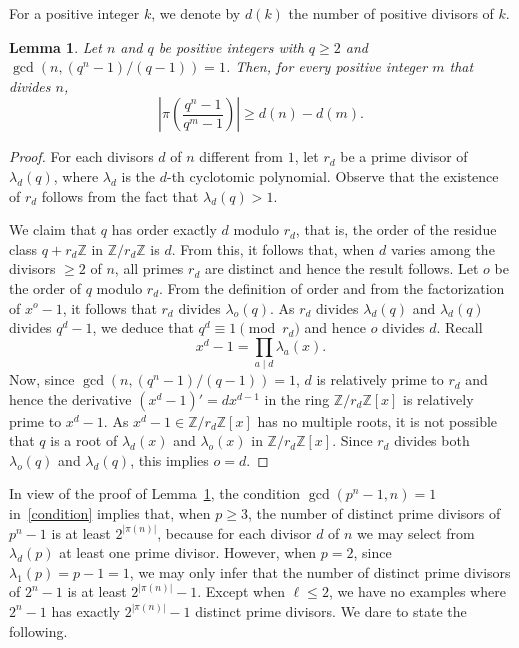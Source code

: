 \documentclass{amsart}
\newtheorem{lemma}[theorem]{Lemma}
\begin{document}
For a positive integer $k$, we denote by
$d(k)$ the number  of positive divisors of $k$.
\begin{lemma}\label{lemma:nt} Let $n$ and $q$ be  positive integers with $q \geq 2$ and  $\gcd(n,(q^{n}-1)/(q-1))=1$.
  Then, for every positive integer $m$ that divides $n$,
  $$
\left|
\pi
\left(
\frac{q^{n}-1}{q^m-1}
\right)
\right|
\ge d(n) - d(m).$$ 
\end{lemma}
\begin{proof}
For each divisors $d$
of $n$ different from $1$, let $r_d$ be a prime divisor of $\lambda_d(q)$, where $\lambda_d$ is the $d$-th cyclotomic polynomial. Observe that the existence of $r_d$ follows from the fact that $\lambda_d(q)>1$.

We claim that $q$ has order exactly $d$ modulo $r_d$, that is, the order of the residue class $q+r_d\mathbb{Z}$ in $\mathbb{Z}/r_d\mathbb{Z}$ is $d$. From this, it follows that, when $d$ varies among the divisors $\ge 2$ of $n$, all primes $r_d$ are distinct and hence the result follows. Let $o$ be the order of $q$ modulo $r_d$. From the definition of order and from the factorization of $x^o-1$, it follows that $r_d$ divides $\lambda_o(q)$. As $r_d$ divides $\lambda_d(q)$ and $\lambda_d(q)$ divides $q^d-1$, we deduce that $q^d\equiv 1\pmod {r_d}$ and hence $o$ divides $d$.  Recall
$$x^d-1=\prod_{a\mid d}\lambda_a(x).$$Now, since $\gcd(n,(q^n-1)/(q-1))=1$, $d$ is relatively prime to $r_d$ and hence the derivative $(x^d-1)'=dx^{d-1}$ in the ring $\mathbb{Z}/{r_d}\mathbb{Z}[x]$ is relatively prime to $x^d-1$. As $x^d-1\in \mathbb{Z}/r_d\mathbb{Z}[x]$ has no multiple roots, it is not possible that $q$ is a root of $\lambda_d(x)$ and $\lambda_o(x)$ in $\mathbb{Z}/r_d\mathbb{Z}[x]$. Since $r_d$ divides both $\lambda_o(q)$ and $\lambda_d(q)$, this implies $o=d$.
%
\end{proof}

In view of the proof of  Lemma~\ref{lemma:nt}, the condition $\gcd(p^n-1,n)=1$ in~\eqref{condition} implies that, when $p\ge 3$,  the number of distinct prime divisors of $p^n-1$ is at least $2^{|\pi(n)|}$, because for each divisor $d$ of $n$ we may select from $\lambda_d(p)$ at least one prime divisor. However, when $p=2$, since $\lambda_1(p)=p-1=1$, we may only infer that the number of distinct prime divisors of $2^n-1$ is at least $2^{|\pi(n)|}-1$. Except when $\ell\le 2$, we have no examples where $2^n-1$ has exactly $2^{|\pi(n)|}-1$ distinct prime divisors. We dare to state the following.
\end{document}
